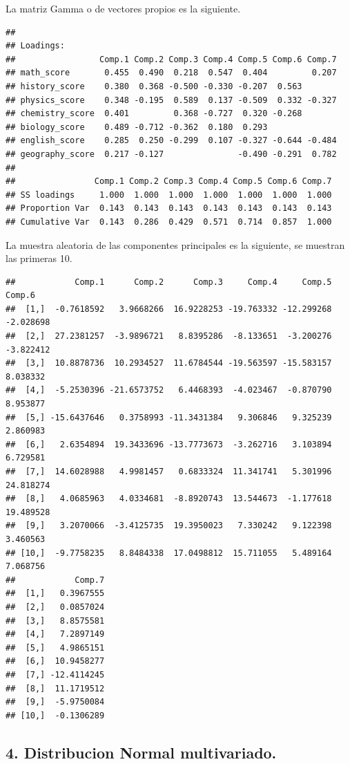 \documentclass[
]{article}
\begin{document}
La matriz Gamma o de vectores propios es la siguiente.

\begin{verbatim}
## 
## Loadings:
##                 Comp.1 Comp.2 Comp.3 Comp.4 Comp.5 Comp.6 Comp.7
## math_score       0.455  0.490  0.218  0.547  0.404         0.207
## history_score    0.380  0.368 -0.500 -0.330 -0.207  0.563       
## physics_score    0.348 -0.195  0.589  0.137 -0.509  0.332 -0.327
## chemistry_score  0.401         0.368 -0.727  0.320 -0.268       
## biology_score    0.489 -0.712 -0.362  0.180  0.293              
## english_score    0.285  0.250 -0.299  0.107 -0.327 -0.644 -0.484
## geography_score  0.217 -0.127               -0.490 -0.291  0.782
## 
##                Comp.1 Comp.2 Comp.3 Comp.4 Comp.5 Comp.6 Comp.7
## SS loadings     1.000  1.000  1.000  1.000  1.000  1.000  1.000
## Proportion Var  0.143  0.143  0.143  0.143  0.143  0.143  0.143
## Cumulative Var  0.143  0.286  0.429  0.571  0.714  0.857  1.000
\end{verbatim}

La muestra aleatoria de las componentes principales es la siguiente, se
muestran las primeras 10.

\begin{verbatim}
##            Comp.1      Comp.2      Comp.3     Comp.4     Comp.5    Comp.6
##  [1,]  -0.7618592   3.9668266  16.9228253 -19.763332 -12.299268 -2.028698
##  [2,]  27.2381257  -3.9896721   8.8395286  -8.133651  -3.200276 -3.822412
##  [3,]  10.8878736  10.2934527  11.6784544 -19.563597 -15.583157  8.038332
##  [4,]  -5.2530396 -21.6573752   6.4468393  -4.023467  -0.870790  8.953877
##  [5,] -15.6437646   0.3758993 -11.3431384   9.306846   9.325239  2.860983
##  [6,]   2.6354894  19.3433696 -13.7773673  -3.262716   3.103894  6.729581
##  [7,]  14.6028988   4.9981457   0.6833324  11.341741   5.301996 24.818274
##  [8,]   4.0685963   4.0334681  -8.8920743  13.544673  -1.177618 19.489528
##  [9,]   3.2070066  -3.4125735  19.3950023   7.330242   9.122398  3.460563
## [10,]  -9.7758235   8.8484338  17.0498812  15.711055   5.489164  7.068756
##            Comp.7
##  [1,]   0.3967555
##  [2,]   0.0857024
##  [3,]   8.8575581
##  [4,]   7.2897149
##  [5,]   4.9865151
##  [6,]  10.9458277
##  [7,] -12.4114245
##  [8,]  11.1719512
##  [9,]  -5.9750084
## [10,]  -0.1306289
\end{verbatim}

\hypertarget{distribucion-normal-multivariado.}{%
\subsection{4. Distribucion Normal
multivariado.}\label{distribucion-normal-multivariado.}}
\end{document}
